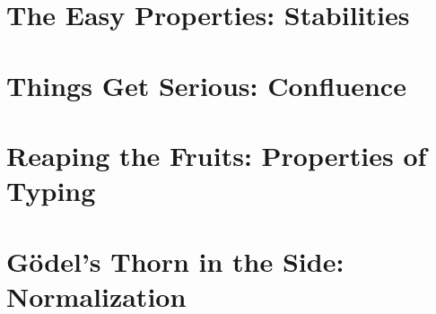 \section[Stabilities]{The Easy Properties: Stabilities}
\label{sec:pcuic-stabilities}

\section[Confluence]{Things Get Serious: Confluence}
\label{sec:pcuic-confluence}

\section[Properties of Typing]{Reaping the Fruits: Properties of Typing}
\label{sec:pcuic-typing-prop}

\section[Normalization]{Gödel’s Thorn in the Side: Normalization}
\label{sec:pcuic-normalization}